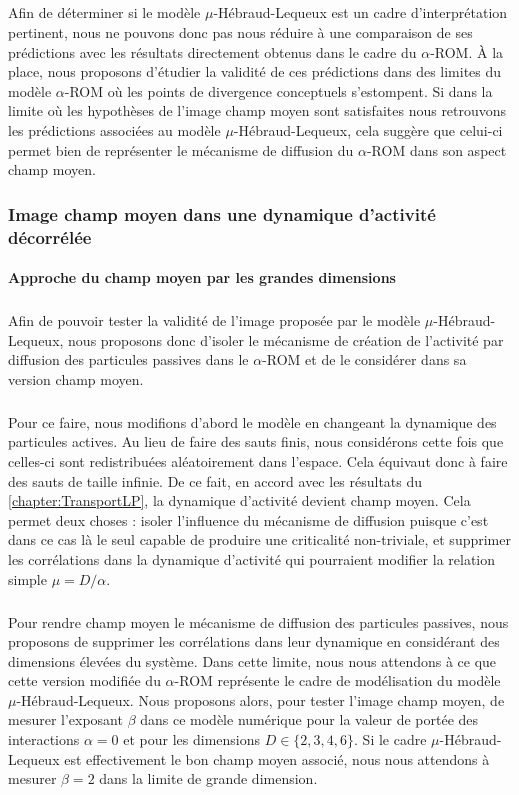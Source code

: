 \subparagraph{}Afin de déterminer si le modèle $\mu$-Hébraud-Lequeux est un cadre d'interprétation pertinent, nous ne pouvons donc pas nous réduire à une comparaison de ses prédictions avec les résultats directement obtenus dans le cadre du $\alpha$-ROM. \`A la place, nous proposons d'étudier la validité de ces prédictions dans des limites du modèle $\alpha$-ROM où les points de divergence conceptuels s'estompent. Si dans la limite où les hypothèses de l'image champ moyen sont satisfaites nous retrouvons les prédictions associées au modèle $\mu$-Hébraud-Lequeux, cela suggère que celui-ci permet bien de représenter le mécanisme de diffusion du $\alpha$-ROM dans son aspect champ moyen.

\subsubsection{Image champ moyen dans une dynamique d'activité décorrélée}


\paragraph{Approche du champ moyen par les grandes dimensions}

\subparagraph{}Afin de pouvoir tester la validité de l'image proposée par le modèle $\mu$-Hébraud-Lequeux, nous proposons donc d'isoler le mécanisme de création de l'activité par diffusion des particules passives dans le $\alpha$-ROM et de le considérer dans sa version champ moyen. 

\subparagraph{}Pour ce faire, nous modifions d'abord le modèle en changeant la dynamique des particules actives. Au lieu de faire des sauts finis, nous considérons cette fois que celles-ci sont redistribuées aléatoirement dans l'espace. Cela équivaut donc à faire des sauts de taille infinie. De ce fait, en accord avec les résultats du \autoref{chapter:TransportLP}, la dynamique d'activité devient champ moyen. Cela permet deux choses : isoler l'influence du mécanisme de diffusion puisque c'est dans ce cas là le seul capable de produire une criticalité non-triviale, et supprimer les corrélations dans la dynamique d'activité qui pourraient modifier la relation simple $\mu = D/\alpha$.

\subparagraph{}Pour rendre champ moyen le mécanisme de diffusion des particules passives, nous proposons de supprimer les corrélations dans leur dynamique en considérant des dimensions élevées du système. Dans cette limite, nous nous attendons à ce que cette version modifiée du $\alpha$-ROM représente le cadre de modélisation du modèle $\mu$-Hébraud-Lequeux. Nous proposons alors, pour tester l'image champ moyen, de mesurer l'exposant $\beta$ dans ce modèle numérique pour la valeur de portée des interactions $\alpha = 0$ et pour les dimensions $D\in\{2,3,4,6\}$. Si le cadre $\mu$-Hébraud-Lequeux est effectivement le bon champ moyen associé, nous nous attendons à mesurer $\beta = 2$ dans la limite de grande dimension.

